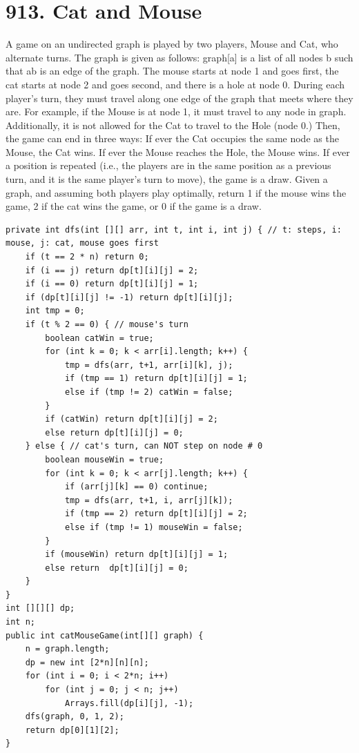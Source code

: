 \documentclass[9pt, b5paaper]{book}
\begin{document}
\section{913. Cat and Mouse}
\label{sec-1-19}
A game on an undirected graph is played by two players, Mouse and Cat, who alternate turns.
The graph is given as follows: graph[a] is a list of all nodes b such that ab is an edge of the graph.
The mouse starts at node 1 and goes first, the cat starts at node 2 and goes second, and there is a hole at node 0.
During each player's turn, they must travel along one edge of the graph that meets where they are.  For example, if the Mouse is at node 1, it must travel to any node in graph\footnotemark[3]{}.
Additionally, it is not allowed for the Cat to travel to the Hole (node 0.)
Then, the game can end in three ways:
If ever the Cat occupies the same node as the Mouse, the Cat wins.
If ever the Mouse reaches the Hole, the Mouse wins.
If ever a position is repeated (i.e., the players are in the same position as a previous turn, and it is the same player's turn to move), the game is a draw.
Given a graph, and assuming both players play optimally, return
1 if the mouse wins the game,
2 if the cat wins the game, or
0 if the game is a draw.
\begin{verbatim}
private int dfs(int [][] arr, int t, int i, int j) { // t: steps, i: mouse, j: cat, mouse goes first
    if (t == 2 * n) return 0;
    if (i == j) return dp[t][i][j] = 2;
    if (i == 0) return dp[t][i][j] = 1;
    if (dp[t][i][j] != -1) return dp[t][i][j];
    int tmp = 0;
    if (t % 2 == 0) { // mouse's turn
        boolean catWin = true;
        for (int k = 0; k < arr[i].length; k++) {
            tmp = dfs(arr, t+1, arr[i][k], j);
            if (tmp == 1) return dp[t][i][j] = 1;
            else if (tmp != 2) catWin = false;
        }
        if (catWin) return dp[t][i][j] = 2;
        else return dp[t][i][j] = 0;
    } else { // cat's turn, can NOT step on node # 0
        boolean mouseWin = true;
        for (int k = 0; k < arr[j].length; k++) {
            if (arr[j][k] == 0) continue;
            tmp = dfs(arr, t+1, i, arr[j][k]);
            if (tmp == 2) return dp[t][i][j] = 2;
            else if (tmp != 1) mouseWin = false;
        }
        if (mouseWin) return dp[t][i][j] = 1;
        else return  dp[t][i][j] = 0;
    }
}
int [][][] dp;
int n;
public int catMouseGame(int[][] graph) {
    n = graph.length;
    dp = new int [2*n][n][n];
    for (int i = 0; i < 2*n; i++) 
        for (int j = 0; j < n; j++)
            Arrays.fill(dp[i][j], -1);
    dfs(graph, 0, 1, 2);
    return dp[0][1][2];
}
\end{verbatim}
\end{document}
